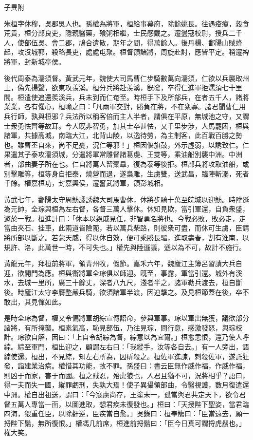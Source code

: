 
\begin{pinyinscope}
子異附

朱桓字休穆，吳郡吳人也。孫權為將軍，桓給事幕府，除餘姚長。往遇疫癘，穀食荒貴，桓分部良吏，隱親醫藥，飱粥相繼，士民感戴之。遷盪寇校尉，授兵二千人，使部伍吳、會二郡，鳩合遺散，期年之間，得萬餘人。後丹楊、鄱陽山賊蜂起，攻沒城郭，殺略長吏，處處屯聚。桓督領諸將，周旋赴討，應皆平定。稍遷裨將軍，封新城亭侯。

後代周泰為濡須督。黃武元年，魏使大司馬曹仁步騎數萬向濡須，仁欲以兵襲取州上，偽先揚聲，欲東攻羨溪。桓分兵將赴羨溪，旣發，卒得仁進軍拒濡須七十里間。桓遣使追還羨溪兵，兵未到而仁奄至。時桓手下及所部兵，在者五千人，諸將業業，各有懼心，桓喻之曰：「凡兩軍交對，勝負在將，不在衆寡。諸君聞曹仁用兵行師，孰與桓邪？兵法所以稱客倍而主人半者，謂俱在平原，無城池之守，又謂士衆勇怯齊等故耳。今人旣非智勇，加其士卒甚怯，又千里步涉，人馬罷困，桓與諸軍，共據高城，南臨大江，北背山陵，以逸待勞，為主制客，此百戰百勝之勢也。雖曹丕自來，尚不足憂，況仁等邪！」桓因偃旗鼓，外示虛弱，以誘致仁。仁果遣其子泰攻濡須城，分遣將軍常雕督諸葛虔、王雙等，乘油船別襲中洲。中洲者，部曲妻子所在也。仁自將萬人留橐臯，復為泰等後拒。桓部兵將攻取油船，或別擊雕等，桓等身自拒泰，燒營而退，遂梟雕，生虜雙，送武昌，臨陣斬溺，死者千餘。權嘉桓功，封嘉興侯，遷奮武將軍，領彭城相。

黃武七年，鄱陽太守周魴譎誘魏大司馬曹休，休將步騎十萬至皖城以迎魴。時陸遜為元帥，全琮與桓為左右督，各督三萬人擊休。休知見欺，當引軍還，自負衆盛，邀於一戰。桓進計曰：「休本以親戚見任，非智勇名將也。今戰必敗，敗必走，走當由夾石、挂車，此兩道皆險阨，若以萬兵柴路，則彼衆可盡，而休可生虜，臣請將所部以斷之。若蒙天威，得以休自效，便可乘勝長驅，進取壽春，割有淮南，以規許、洛，此萬世一時，不可失也。」權先與陸遜議，遜以為不可，故計不施行。

黃龍元年，拜桓前將軍，領青州牧，假節。嘉禾六年，魏廬江主簿呂習請大兵自迎，欲開門為應。桓與衞將軍全琮俱以師迎。旣至，事露，軍當引還。城外有溪水，去城一里所，廣三十餘丈，深者八九尺，淺者半之，諸軍勒兵渡去，桓自斷後。時廬江太守李膺整嚴兵騎，欲須諸軍半渡，因迫擊之。及見桓節蓋在後，卒不敢出，其見憚如此。

是時全琮為督，權又令偏將軍胡綜宣傳詔命，參與軍事。琮以軍出無獲，議欲部分諸將，有所掩襲。桓素氣高，恥見部伍，乃往見琮，問行意，感激發怒，與琮校計。琮欲自解，因曰：「上自令胡綜為督，綜意以為宜爾。」桓愈恚恨，還乃使人呼綜。綜至軍門，桓出迎之，顧謂左右曰：「我縱手，汝等各自去。」有一人旁出，語綜使還。桓出，不見綜，知左右所為，因斫殺之。桓佐軍進諫，刺殺佐軍，遂託狂發，詣建業治病。權惜其功能，故不罪。孫盛曰：書云臣無作威作福，作威作福，則凶于而家，害于而國。桓之賊忍，殆虎狼也，人君且猶不可，況將相乎？語曰，得一夫而失一國，縱罪虧刑，失孰大焉！使子異攝領部曲，令醫視護，數月復遣還中洲。權自出祖送，謂曰：「今寇虜尚存，王塗未一，孤當與君共定天下，欲令君督五萬人專當一靣，以圖進取，想君疾未復發也。」桓曰：「天授陛下聖姿，當君臨四海，猥重任臣，以除姧逆，臣疾當自愈。」吳錄曰：桓奉觴曰：「臣當遠去，願一捋陛下鬚，無所復恨。」權馮几前席，桓進前捋鬚曰：「臣今日真可謂捋虎鬚也。」權大笑。


\end{pinyinscope}
